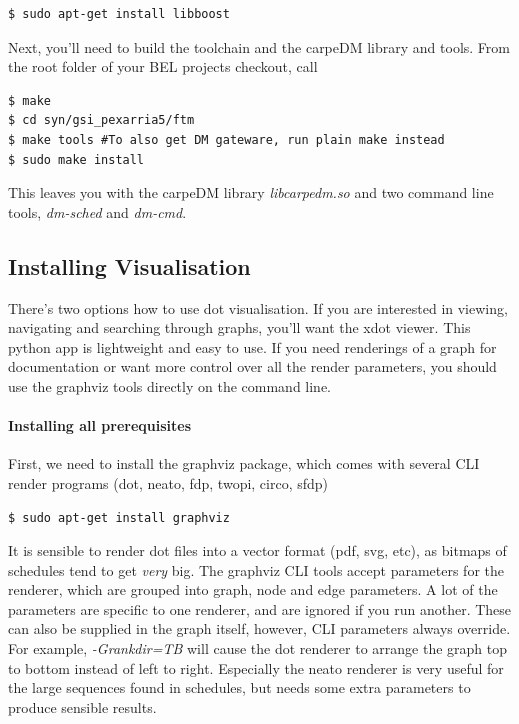 \begin{lstlisting}[style = customshell]
$ sudo apt-get install libboost
\end{lstlisting}

Next, you'll need to build the toolchain and the carpeDM library and tools. From the root folder of your BEL projects checkout, call
%
\begin{lstlisting}[style = customshell]
$ make
$ cd syn/gsi_pexarria5/ftm
$ make tools #To also get DM gateware, run plain make instead
$ sudo make install
\end{lstlisting}
%
This leaves you with the carpeDM library \emph{libcarpedm.so} and two command line tools, \emph{dm-sched} and \emph{dm-cmd}.

\subsection{Installing Visualisation}

There's two options how to use dot visualisation. If you are interested in viewing, navigating and searching through graphs, you'll want the xdot viewer. This python app is lightweight and easy to use.
If you need renderings of a graph for documentation or want more control over all the render parameters, you should use the graphviz tools directly on the command line.

\paragraph{Installing all prerequisites}
First, we need to install the graphviz package, which comes with several CLI render programs (dot, neato, fdp, twopi, circo, sfdp)

\begin{lstlisting}[style = customshell]
$ sudo apt-get install graphviz
\end{lstlisting}

It is sensible to render dot files into a vector format (pdf, svg, etc), as bitmaps of schedules tend to get \emph{very} big. The graphviz CLI tools accept parameters for the renderer, which are grouped
into graph, node and edge parameters. A lot of the parameters are specific to one renderer, and are ignored if you run another. These can also be supplied in the graph itself, however, CLI parameters always override. For example, \emph{-Grankdir=TB} will cause the dot renderer to arrange the graph top to bottom instead of left to right. Especially the neato renderer is very useful for the large sequences found in schedules, but needs some extra parameters to produce sensible results.

